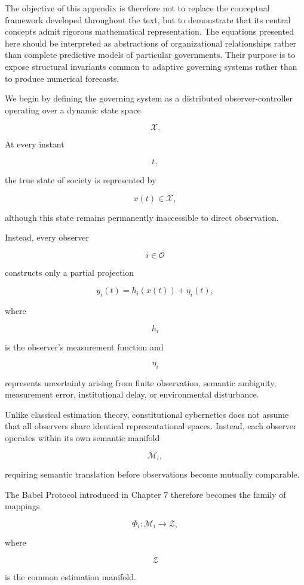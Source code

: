 \documentclass[12pt,a4paper]{article}
\begin{document}
The objective of this appendix is therefore not to replace the conceptual framework developed throughout the text, but to demonstrate that its central concepts admit rigorous mathematical representation. The equations presented here should be interpreted as abstractions of organizational relationships rather than complete predictive models of particular governments. Their purpose is to expose structural invariants common to adaptive governing systems rather than to produce numerical forecasts.

We begin by defining the governing system as a distributed observer-controller operating over a dynamic state space

\[
\mathcal{X}.
\]

At every instant

\[
t,
\]

the true state of society is represented by

\[
x(t)\in\mathcal{X},
\]

although this state remains permanently inaccessible to direct observation.

Instead, every observer

\[
i\in\mathcal{O}
\]

constructs only a partial projection

\[
y_i(t)
=
h_i(x(t))
+
\eta_i(t),
\]

where

\[
h_i
\]

is the observer's measurement function and

\[
\eta_i
\]

represents uncertainty arising from finite observation, semantic ambiguity, measurement error, institutional delay, or environmental disturbance.

Unlike classical estimation theory, constitutional cybernetics does not assume that all observers share identical representational spaces. Instead, each observer operates within its own semantic manifold

\[
\mathcal{M}_i,
\]

requiring semantic translation before observations become mutually comparable.

The Babel Protocol introduced in Chapter 7 therefore becomes the family of mappings

\[
\Phi_i
:
\mathcal{M}_i
\rightarrow
\mathcal{Z},
\]

where

\[
\mathcal{Z}
\]

is the common estimation manifold.
\end{document}
